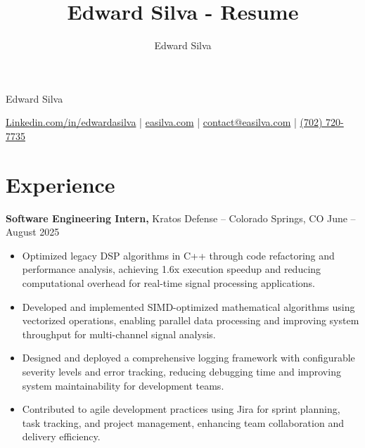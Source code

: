 \documentclass[11pt]{article}
\title{Edward Silva - Resume}
\author{Edward Silva}
\begin{document}
\thispagestyle{empty}


\centerline{\huge Edward Silva}
\vspace{5pt}

\centerline{
\href{https://www.linkedin.com/in/edwardasilva/}{Linkedin.com/in/edwardasilva}
| \href{https://easilva.com}{easilva.com}
| \href{mailto:contact@easilva.com}{contact@easilva.com} 
| \href{tel:702 720-7735}{(702) 720-7735}
}

\vspace{-14pt}
\section*{Experience}
\vspace{5pt}

\textbf{Software Engineering Intern, }{Kratos Defense} -- Colorado Springs, CO \hfill June -- August 2025 \\
\vspace{-5pt}
\begin{itemize}
  \item Optimized legacy DSP algorithms in C++ through code refactoring and performance analysis, achieving 1.6x execution speedup and reducing computational overhead for real-time signal processing applications.
  \item Developed and implemented SIMD-optimized mathematical algorithms using vectorized operations, enabling parallel data processing and improving system throughput for multi-channel signal analysis.
  \item Designed and deployed a comprehensive logging framework with configurable severity levels and error tracking, reducing debugging time and improving system maintainability for development teams.
  \item Contributed to agile development practices using Jira for sprint planning, task tracking, and project management, enhancing team collaboration and delivery efficiency.
\end{itemize}
\end{document}
